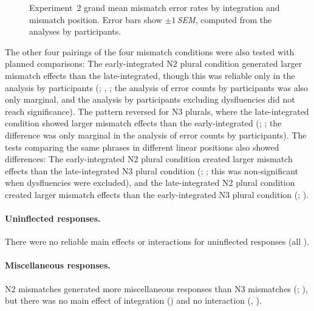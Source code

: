 \documentclass[12pt,titlepage]{article}
\newcommand{\itt}{\textit}  %
\newcommand{\insertnote}[1]{%
\vspace{\baselineskip}
\noindent
\begin{minipage}{\textwidth}
\begin{center}
========================= \\
Insert #1 About Here \\
========================= \\
\end{center}
\vspace{.8\baselineskip}
\end{minipage}}
\newcommand{\framefig}[1]{#1}
\newcommand{\IGNORE}[1]{} %
\newcommand{\showp}[1]{\IGNORE{#1}} %
\begin{document}

\begin{figure}[tb]
\makebox[\textwidth][c]{\framefig{\texttt{[image: HP2mismatch]}}}

\caption{Experiment~2 grand mean mismatch error rates by integration and
mismatch position.  Error bars show $\pm1\,$\itt{SEM}, computed from the
analyses by participants.}

\label{HP2mismatch}
\end{figure}

The other four pairings of the four mismatch conditions were also tested
with planned comparisons: The early-integrated N2 plural condition
generated larger mismatch effects than the late-integrated, though this was
reliable only in the analysis by participants
(\showp{, \p{05}}; , ;
the analysis of error counts by participants was also only marginal, and
the analysis by participants excluding dysfluencies did not reach
significance).  The pattern reversed for N3 plurals, where the
late-integrated condition showed larger mismatch effects than the
early-integrated (\showp{, \p{05}};
\showp{, \p{05}}; the difference was only marginal in
the analysis of error counts by participants).  The tests comparing the
same phrases in different linear positions also showed differences: The
early-integrated N2 plural condition created larger mismatch effects than
the late-integrated N3 plural condition (\showp{,
\p{05}}; \showp{, \p{01}}; this was non-significant
when dysfluencies were excluded), and the late-integrated N2 plural
condition created larger mismatch effects than the early-integrated N3
plural condition (\showp{, \p{01}};
\showp{, \p{01}}).

\paragraph{Uninflected responses.} There were no reliable main effects or
interactions for uninflected responses (all \Fsweak).

\paragraph{Miscellaneous responses.} N2 mismatches generated more
miscellaneous responses than N3 mismatches (\showp{,
\p{05}}; \showp{, \p{01}}), but there was no main effect
of integration (\Fsweak) and no interaction (\Fsweak[1.4], \psweak[20]).
\end{document}
